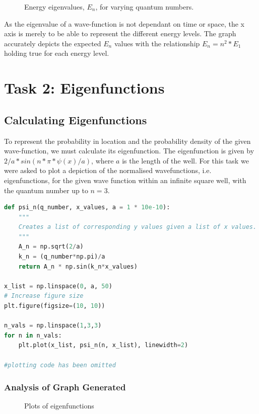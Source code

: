 \documentclass[a4paper,12pt]{article}
\begin{document}
\begin{figure}[H]
    \begin{center}
        
        \caption{Energy eigenvalues, \(E_n\), for varying quantum numbers. }
        \label{fig:enter-label}
    \end{center}
\end{figure}
As the eigenvalue of a wave-function is not dependant on time or space, the x axis is merely to be able to represent the different energy levels. The graph accurately depicts the expected \(E_n\) values with the relationship \(E_n = n^2 * E_1 \) holding true for each energy level.

\section{Task 2: Eigenfunctions}
\subsection{Calculating Eigenfunctions}
To represent the probability in location and the probability density of the given wave-function, we must calculate its eigenfunction.  The eigenfunction is given by \(2/a * sin(n*\pi*\psi(x)/a) \), where \(a\) is the length of the well.\cite{eisenberg}
For this task we were asked to plot a depiction of the normalised wavefunctions, i.e. eigenfunctions, for the given wave function within an infinite square well, with the quantum number up to \(n=3\). 

\begin{lstlisting}[language=Python, caption= Code used to calculate eigenvectors]
def psi_n(q_number, x_values, a = 1 * 10e-10):
    """
    Creates a list of corresponding y values given a list of x values.
    """
    A_n = np.sqrt(2/a)
    k_n = (q_number*np.pi)/a
    return A_n * np.sin(k_n*x_values)

x_list = np.linspace(0, a, 50)
# Increase figure size
plt.figure(figsize=(10, 10))

n_vals = np.linspace(1,3,3)
for n in n_vals:
    plt.plot(x_list, psi_n(n, x_list), linewidth=2)
    
#plotting code has been omitted
\end{lstlisting}

\subsubsection{Analysis of Graph Generated}
\begin{figure}[H]

\caption{Plots of eigenfunctions}
\end{figure}
\end{document}
